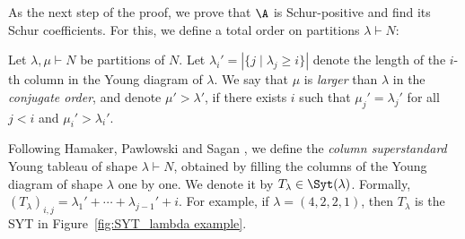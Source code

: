 As the next step of the proof, we prove that $\A$ is Schur-positive and find its Schur coefficients. For this, we define a total order on partitions $\lambda \vdash N$:
\begin{definition}
\label{def:conjugate order}
    Let $\lambda, \mu \vdash N$ be partitions of $N$. Let $\lambda_i' = |\{j \mid \lambda_j \ge i\}|$ denote the length of the $i$-th column in the Young diagram of $\lambda$. We say that $\mu$ is \emph{larger} than $\lambda$ in the \emph{conjugate order}, and denote $\mu' > \lambda'$, if there exists $i$ such that $\mu_j' = \lambda_j'$ for all $j < i$ and $\mu_i' > \lambda_i'$.
\end{definition}

Following Hamaker, Pawlowski and Sagan \cite[Section 5]{S3_patterns_list}, we define the \emph{column superstandard} Young tableau of shape $\lambda \vdash N$, obtained by filling the columns of the Young diagram of shape $\lambda$ one by one. We denote it by $T_\lambda \in \Syt(\lambda)$.
Formally, $(T_\lambda)_{i,j} = \lambda_1' + \cdots + \lambda_{j-1}' + i$. For example, if $\lambda = (4,2,2,1)$, then $T_\lambda$ is the SYT in Figure~\ref{fig:SYT_lambda example}.

